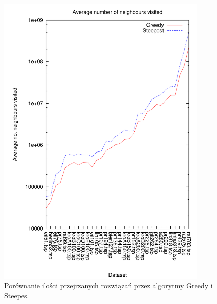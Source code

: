 \begin{figure}
\begin{center}
\includegraphics[width=0.9\textwidth]{wykresy/ng_comp}
\end{center}
\caption{Porównanie ilości przejrzanych rozwiązań przez algorytmy Greedy i Steepes.}
\label{ng_comp}
\end{figure}

